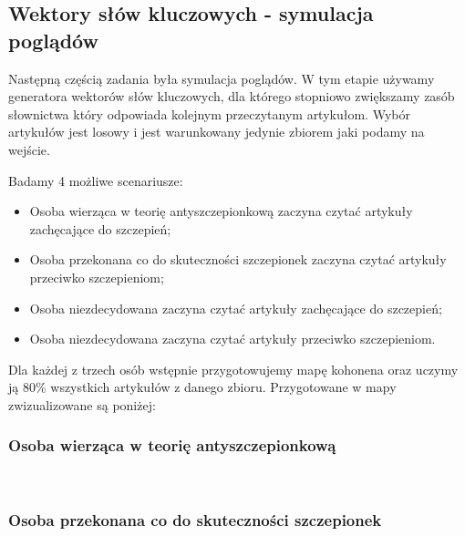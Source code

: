 \documentclass[11pt]{article}
\begin{document}
\subsection*{Wektory słów kluczowych - symulacja poglądów}

Następną częścią zadania była symulacja poglądów. W tym etapie używamy 
generatora wektorów słów kluczowych, dla którego stopniowo zwiększamy zasób słownictwa który
odpowiada kolejnym przeczytanym artykułom. Wybór artykułów jest losowy i jest warunkowany jedynie
zbiorem jaki podamy na wejście.

Badamy 4 możliwe scenariusze:
\begin{itemize}
    \item Osoba wierząca w teorię antyszczepionkową zaczyna czytać artykuły zachęcające do szczepień;
    \item Osoba przekonana co do skuteczności szczepionek zaczyna czytać artykuły przeciwko 
    szczepieniom;
    \item Osoba niezdecydowana zaczyna czytać artykuły zachęcające do szczepień;
    \item Osoba niezdecydowana zaczyna czytać artykuły przeciwko szczepieniom.
\end{itemize}

Dla każdej z trzech osób wstępnie przygotowujemy mapę kohonena oraz uczymy ją 80\% wszystkich artykułów z danego zbioru.
Przygotowane w mapy zwizualizowane są poniżej:

    \subsubsection*{Osoba wierząca w teorię antyszczepionkową}

    \begin{center}
    \end{center}
    { \hspace*{\fill} \\}

    \subsubsection*{Osoba przekonana co do skuteczności szczepionek}

    \begin{center}
    \end{center}
    { \hspace*{\fill} \\}
\end{document}
